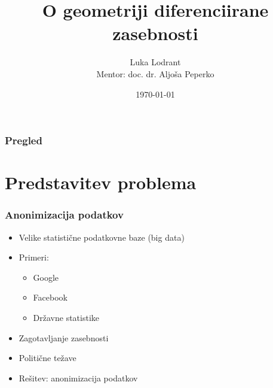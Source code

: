 \documentclass{beamer}
\title[Short title]{O geometriji diferenciirane zasebnosti} %
\author[Luka Lodrant]{Luka Lodrant \\{\small Mentor: doc. dr. Aljoša Peperko}} %
\institute[FMF] %
{
Fakulteta za matematiko in fiziko %
}
\date{\today} %
\theoremstyle{definition}
\begin{document}
\begin{frame}
\titlepage %
\end{frame}

\begin{frame}
\frametitle{Pregled} %
\tableofcontents %
\end{frame}


\section{Predstavitev problema} %

\begin{frame}
\frametitle{Anonimizacija podatkov}
\begin{itemize}
\item Velike statistične podatkovne baze (big data)
\item Primeri:
\begin{itemize}
	\item Google
	\item Facebook
	\item Državne statistike
\end{itemize}
\item Zagotavljanje zasebnosti
\item Politične težave
\item Rešitev: anonimizacija podatkov
\end{itemize}
\end{frame}
\end{document}

